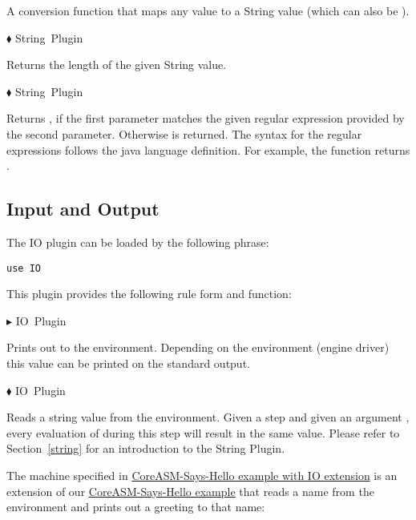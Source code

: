 \documentclass{article}
\makeatletter
\newcommand{\ruleform}[2]{\pform{$\blacktriangleright$}{#1}{#2}}
\newcommand{\funcform}[2]{\pform{$\blacklozenge$}{#1}{#2}}
\newcommand{\pform}[3]{\vspace*{4mm} \noindent #1 #2 \vspace{1mm}\textcolor[gray]{0.7}{\dotfill}\mbox{{\sffamily \footnotesize #3}}}
\newcommand{\indexrule}[1]{\index{#1 rule@\asm{#1} rule}}
\makeatother
\begin{document}
A conversion function that maps any value to a String value (which can also be ).

\funcform{
}{String Plugin}

Returns the length of the given String value.

\funcform{
}{String Plugin}

Returns , if the first parameter matches the given regular expression provided by the second parameter. Otherwise  is returned. The syntax for the regular expressions follows the java language definition. For example, the function  returns .

\subsection{Input and Output}
\label{io}

The IO plugin can be loaded by the following  phrase:

\begin{lstlisting}
use IO
\end{lstlisting}

\noindent This plugin provides the following rule form and function:

\ruleform{
}{IO Plugin}
\indexrule{print}

Prints out  to the environment. Depending on the environment (engine driver) this value can be printed on the standard output.

\funcform{
}{IO Plugin}

Reads a string value from the environment. Given a step and given an argument , every evaluation of  during this step will result in the same value. Please refer to Section~\ref{string} for an introduction to the String Plugin. 

The machine specified in \hyperref[spec:sayshello]{CoreASM-Says-Hello example with IO extension} is an extension of our \hyperref[spec:thisiscoreasm]{CoreASM-Says-Hello example} that reads a name from the environment and prints out a greeting to that name:
\end{document}
